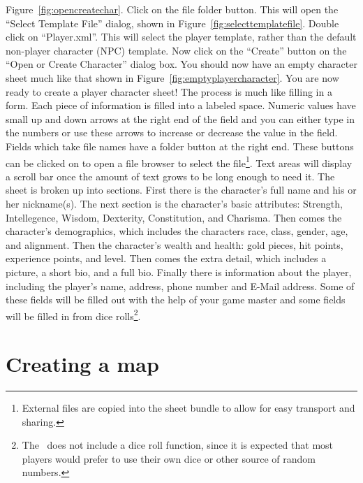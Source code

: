 Figure~\ref{fig:opencreatechar}.  Click on the file folder button. 
This will open the ``Select Template File'' dialog, shown in
Figure~\ref{fig:selecttemplatefile}. Double click on ``Player.xml''. 
This will select the player template, rather than the default
non-player character (NPC) template.  Now click on the ``Create''
button on the ``Open or Create Character'' dialog box.  You should now
have an empty character sheet much like that shown in
Figure~\ref{fig:emptyplayercharacter}. You are now ready to create a
player character sheet!  The process is much like filling in a form.
Each piece of information is filled into a labeled space.  Numeric
values have small up and down arrows at the right end of the field and
you can either type in the numbers or use these arrows to increase or
decrease the value in the field.  Fields which take file names have a
folder button at the right end.  These buttons can be clicked on to
open a file browser to select the file\footnote{External files are
copied into the sheet bundle to allow for easy transport and sharing.}.
 Text areas will display a scroll bar once the amount of text grows to
be long enough to need it. The sheet is broken up into sections.  First
there is the character's full name and his or her nickname(s).  The
next section is the character's basic attributes: Strength,
Intellegence, Wisdom, Dexterity, Constitution, and Charisma.  Then
comes the character's demographics, which includes the characters race,
class, gender, age, and alignment.  Then the character's wealth and
health: gold pieces, hit points, experience points, and level.  Then
comes the extra detail, which includes a picture, a short bio, and a
full bio.  Finally there is information about the player, including the
player's name, address, phone number and E-Mail address.  Some of these
fields will be filled out with the help of your game master and some
fields will be filled in from dice rolls\footnote{The \thesystem\  does
not include a dice roll function, since it is expected that most
players would prefer to use their own dice or other source of random
numbers.}.

\section{Creating a map}



